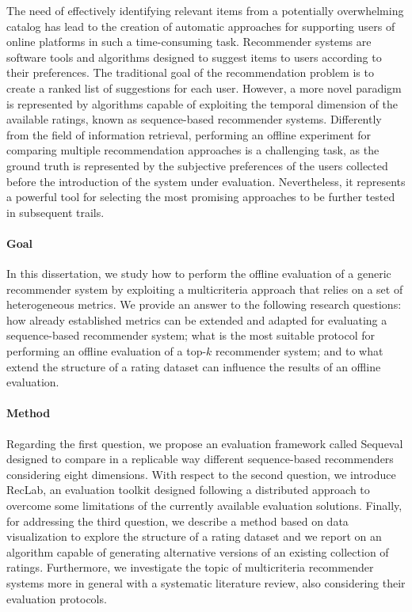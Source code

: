 The need of effectively identifying relevant items from a potentially overwhelming catalog has lead to the creation of automatic approaches for supporting users of online platforms in such a time-consuming task. Recommender systems are software tools and algorithms designed to suggest items to users according to their preferences. The traditional goal of the recommendation problem is to create a ranked list of suggestions for each user. However, a more novel paradigm is represented by algorithms capable of exploiting the temporal dimension of the available ratings, known as sequence-based recommender systems. Differently from the field of information retrieval, performing an offline experiment for comparing multiple recommendation approaches is a challenging task, as the ground truth is represented by the subjective preferences of the users collected before the introduction of the system under evaluation. Nevertheless, it represents a powerful tool for selecting the most promising approaches to be further tested in subsequent trails.

\paragraph{Goal}

In this dissertation, we study how to perform the offline evaluation of a generic recommender system by exploiting a multicriteria approach that relies on a set of heterogeneous metrics. We provide an answer to the following research questions: how already established metrics can be extended and adapted for evaluating a sequence-based recommender system; what is the most suitable protocol for performing an offline evaluation of a top-$k$ recommender system; and to what extend the structure of a rating dataset can influence the results of an offline evaluation.

\paragraph{Method}

Regarding the first question, we propose an evaluation framework called Sequeval designed to compare in a replicable way different sequence-based recommenders considering eight dimensions. With respect to the second question, we introduce RecLab, an evaluation toolkit designed following a distributed approach to overcome some limitations of the currently available evaluation solutions. Finally, for addressing the third question, we describe a method based on data visualization to explore the structure of a rating dataset and we report on an algorithm capable of generating alternative versions of an existing collection of ratings. Furthermore, we investigate the topic of multicriteria recommender systems more in general with a systematic literature review, also considering their evaluation protocols.

